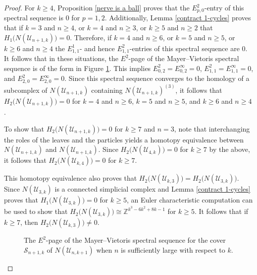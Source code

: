 \documentclass[pagebackref,colorlinks,citecolor=blue,linkcolor=blue,urlcolor=blue,filecolor=blue]{article}
\theoremstyle{definition}\newtheorem{definition}[thm]{Definition}
\theoremstyle{definition}
\newcommand{\Z}{\ensuremath{\mathbb{Z}}}
\begin{document}
\begin{proof}
For $k\ge 4$, Proposition \ref{nerve is a ball} proves that the $E^{2}_{p,0}$-entry of this spectral sequence is $0$ for $p=1,2$.
Additionally, Lemma \ref{contract 1-cycles} proves that if $k=3$ and $n\ge 4$, or $k=4$ and $n\ge 3$, or $k\ge 5$ and $n\ge 2$ that $H_{1}\big(N(\mathcal{U}_{n+1, k})\big)=0$.
Therefore, if $k=4$ and $n\ge 6$, or $k=5$ and $n\ge 5$, or $k\ge 6$ and $n\ge 4$ the $E^{1}_{1,1}$- and hence $E^{2}_{1,1}$-entries of this spectral sequence are $0$.
It follows that in these situations, the $E^{2}$-page of the Mayer--Vietoris spectral sequence is of the form in Figure \ref{MayerVietoris E2 of nerve}.
This implies $E^{2}_{0,2}=E^{\infty}_{0,2}=0$, $E^{2}_{1,1}=E^{\infty}_{1,1}=0$, and $E^{2}_{2,0}=E^{\infty}_{2,0}=0$.
Since this spectral sequence converges to the homology of a subcomplex of $N(\mathcal{U}_{n+1, k})$ containing $N(\mathcal{U}_{n+1, k})^{(3)}$, it follows that $H_{2}\big(N(\mathcal{U}_{n+1, k})\big)=0$ for $k=4$ and $n\ge 6$, $k=5$ and $n\ge 5$, and $k\ge 6$ and $n \ge 4$.

To show that $H_{2}\big(N(\mathcal{U}_{n+1, k})\big)=0$ for $k\ge 7$ and $n=3$, note that interchanging the roles of the leaves and the particles yields a homotopy equivalence between $N(\mathcal{U}_{n+1, k})$ and $N(\mathcal{U}_{n+1, k})$.
Since $H_{2}\big(N(\mathcal{U}_{4, k})\big)=0$ for $k\ge 7$ by the above, it follows that $H_{2}\big(N(\mathcal{U}_{k, 4})\big)=0$ for $k\ge 7$.

This homotopy equivalence also proves that $H_{2}\big(N(\mathcal{U}_{k, 3})\big)=H_{2}\big(N(\mathcal{U}_{3, k})\big)$.
Since $N(\mathcal{U}_{3, k})$ is a connected simplicial complex and Lemma \ref{contract 1-cycles} proves that $H_{1}\big(N(\mathcal{U}_{3, k})\big)=0$ for $k\ge 5$, an Euler characteristic computation can be used to show that $H_{2}\big(N(\mathcal{U}_{3, k})\big)\cong \Z^{k^{3}-6k^{2}+8k-1}$ for $k\ge 5$.
It follows that if $k\ge 7$, then $H_{2}\big(N(\mathcal{U}_{k, 3})\big)\neq 0$.

\begin{figure}[h]
\centering
{}
\caption{The $E^{2}$-page of the Mayer--Vietoris spectral sequence for the cover $\mathcal{S}_{n+1,k}$ of $N(\mathcal{U}_{n, k+1})$ when $n$ is sufficiently large with respect to $k$.}
\label{MayerVietoris E2 of nerve}
\end{figure}
\end{proof}
\end{document}
